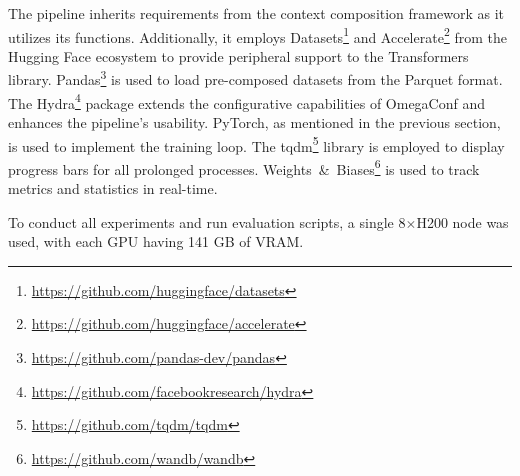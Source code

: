 The pipeline inherits requirements from the context composition framework as it utilizes its functions. Additionally, it employs Datasets\footnote{\url{https://github.com/huggingface/datasets}} and Accelerate\footnote{\url{https://github.com/huggingface/accelerate}} from the Hugging Face ecosystem to provide peripheral support to the Transformers library. Pandas\footnote{\url{https://github.com/pandas-dev/pandas}} is used to load pre-composed datasets from the Parquet format. The Hydra\footnote{\url{https://github.com/facebookresearch/hydra}} package extends the configurative capabilities of OmegaConf and enhances the pipeline's usability. PyTorch, as mentioned in the previous section, is used to implement the training loop. The tqdm\footnote{\url{https://github.com/tqdm/tqdm}} library is employed to display progress bars for all prolonged processes. Weights~\&~Biases\footnote{\url{https://github.com/wandb/wandb}} is used to track metrics and statistics in real-time.

To conduct all experiments and run evaluation scripts, a single 8\(\times\)H200 node was used, with each GPU having 141 GB of VRAM.
